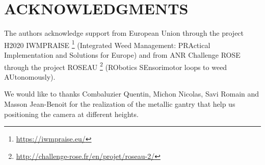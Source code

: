 \documentclass[a4paper,twoside]{article}
\begin{document}
	\section*{\uppercase{Acknowledgments}}
	
	\par The authors acknowledge support from European Union through the project H2020 IWMPRAISE \footnote{\url{https://iwmpraise.eu/}}
	(Integrated Weed Management: PRActical Implementation and Solutions for Europe)
	and from ANR Challenge ROSE through the project ROSEAU \footnote{\url{http://challenge-rose.fr/en/projet/roseau-2/}} (RObotics SEnsorimotor loops to weed AUtonomously).
	\\
	\par We would like to thanks Combaluzier Quentin, Michon Nicolas, Savi Romain and Masson Jean-Benoit
	for the realization of the metallic gantry that help us positioning the camera at different heights.
	
	
	
	
	
\end{document}
